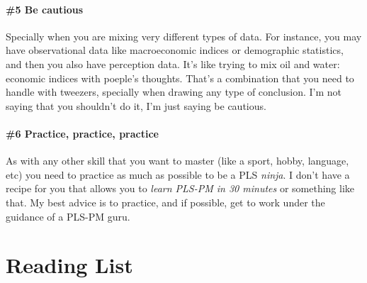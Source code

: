 \documentclass[12pt]{book}\usepackage{graphicx, color}
\begin{document}
\paragraph{\#5 Be cautious}
Specially when you are mixing very different types of data. For instance, you may have observational data like macroeconomic indices or demographic statistics, and then you also have perception data. It's like trying to mix oil and water: economic indices with poeple's thoughts. That's a combination that you need to handle with tweezers, specially when drawing any type of conclusion. I'm not saying that you shouldn't do it, I'm just saying be cautious.

\paragraph{\#6 Practice, practice, practice}
As with any other skill that you want to master (like a sport, hobby, language, etc) you need to practice as much as possible to be a PLS \textit{ninja}. I don't have a recipe for you that allows you to \textit{learn PLS-PM in 30 minutes} or something like that. My best advice is to practice, and if possible, get to work under the guidance of a PLS-PM guru.


\section{Reading List}
\end{document}
